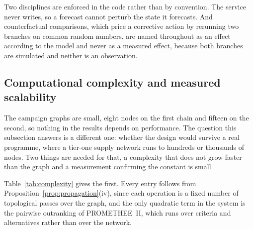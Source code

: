 Two disciplines are enforced in the code rather than by convention. The service never writes,
so a forecast cannot perturb the state it forecasts. And counterfactual comparisons, which
price a corrective action by rerunning two branches on common random numbers, are named
throughout as an effect according to the model and never as a measured effect, because both
branches are simulated and neither is an observation.



\subsection{Computational complexity and measured scalability}
\label{sec:complexity}

The campaign graphs are small, eight nodes on the first chain and fifteen on the second, so
nothing in the results depends on performance. The question this subsection answers is a
different one: whether the design would survive a real programme, where a tier-one supply
network runs to hundreds or thousands of nodes. Two things are needed for that, a complexity
that does not grow faster than the graph and a measurement confirming the constant is small.

Table~\ref{tab:complexity} gives the first. Every entry follows from
Proposition~\ref{prop:propagation}(iv), since each operation is a fixed number of topological
passes over the graph, and the only quadratic term in the system is the pairwise outranking of
PROMETHEE~II, which runs over criteria and alternatives rather than over the network.

